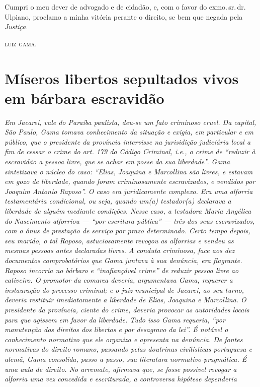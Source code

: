 Cumpri o meu dever de advogado e de cidadão, e, com o favor do exmo.\,sr.\,dr.\,Ulpiano, proclamo a minha vitória perante o direito, se bem que
negada pela \emph{Justiça}.

\textsc{luiz gama}.

\part{Míseros libertos sepultados vivos em bárbara escravidão}

\emph{Em Jacareí, vale do Paraíba paulista, deu-se um fato criminoso
cruel. Da capital, São Paulo, Gama tomava conhecimento da situação e
exigia, em particular e em público, que o presidente da província
intervisse na jurisidição judiciária local a fim de cessar o crime do
art. 179 do Código Criminal, i.e., o crime de ``reduzir à escravidão a
pessoa livre, que se achar em posse da sua liberdade''. Gama sintetizava
o núcleo do caso: ``Elias, Joaquina e Marcollina são livres, e estavam em
gozo de liberdade, quando foram criminosamente escravizados, e vendidos
por Joaquim Antonio Raposo''. O caso era juridicamente complexo. Era uma
alforria testamentária condicional, ou seja, quando um(a) testador(a)
declarava a liberdade de alguém mediante condições. Nesse caso, a
testadora Maria Angélica do Nascimento alforriou --- ``por escritura
pública'' --- três dos seus escravizados, com o ônus de prestação de
serviço por prazo determinado. Certo tempo depois, seu marido, o tal
Raposo, astuciosamente revogou as alforrias e vendeu as mesmas pessoas
antes declaradas livres. A conduta criminosa, face aos dez documentos
comprobatórios que Gama juntava à sua denúncia, era flagrante. Raposo
incorria no bárbaro e ``inafiançável crime'' de reduzir pessoa livre ao
cativeiro. O promotor da comarca deveria, argumentava Gama, requerer a
instauração do processo criminal; e o juiz municipal de Jacareí, ao seu
turno, deveria restituir imediatamente a liberdade de Elias, Joaquina e
Marcollina. O presidente da província, ciente do crime, deveria provocar
as autoridades locais para que agissem em favor da liberdade. Tudo isso
Gama requeria, ``por manutenção dos direitos dos libertos e por desagravo
da lei''. É notável o conhecimento normativo que ele organiza e apresenta
na denúncia. De fontes normativas do direito romano, passando pelas
doutrinas civilísticas portuguesa e alemã, Gama consolida, passo a
passo, sua literatura normativo-pragmática. É uma aula de direito. No
arremate, afirmava que, se fosse possível revogar a alforria uma vez
concedida e escriturada, a controversa hipótese dependeria
}
